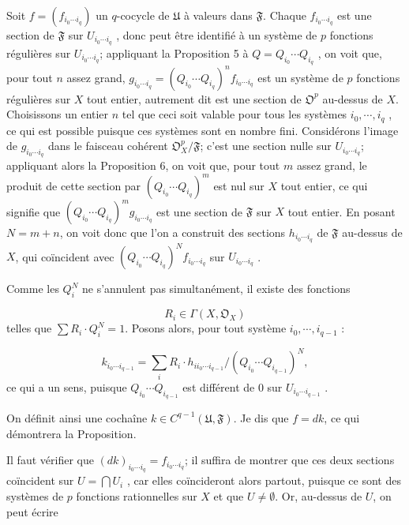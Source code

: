 Soit $f = (f_{i_0 \cdots i_q})$ un $q$-cocycle de $\mathfrak{U}$ à valeurs dans $\mathfrak{F}$. Chaque $f_{i_0 \cdots i_q}$ est une section de $\mathfrak{F}$ sur $U_{i_0 \cdots i_q}$ , donc peut être identifié à un système de $p$ fonctions régulières sur $U_{i_0 \cdots i_q}$; appliquant la Proposition 5 à $Q = Q_{i_0} \cdots Q_{i_q}$ , on voit que, pour tout $n$ assez grand, $g_{i_0 \cdots i_q} = (Q_{i_0} \cdots Q_{i_q})^n f_{i_0 \cdots i_q}$ est un système de $p$ fonctions régulières sur $X$ tout entier, autrement dit est une section de $\mathfrak{O}^p$ au-dessus de $X$. Choisissons un entier $n$ tel que ceci soit valable pour tous les systèmes $i_0 , \cdots , i_q$ , ce qui est possible puisque ces systèmes sont en nombre fini. Considérons l'image de $g_{i_0 \cdots i_q}$ dans le faisceau cohérent $\mathfrak{O}^p_X/\mathfrak{F}$; c'est une section nulle sur $U_{i_0 \cdots i_q}$; appliquant alors la Proposition 6, on voit que, pour tout $m$ assez grand, le produit de cette section par $(Q_{i_0} \cdots Q_{i_q})^m$ est nul sur $X$ tout entier, ce qui signifie que $(Q_{i_0} \cdots Q_{i_q})^m g_{i_0 \cdots i_q}$ est une section de $\mathfrak{F}$ sur $X$ tout entier. En posant $N = m + n$, on voit donc que l'on a construit des sections $h_{i_0 \cdots i_q}$ de $\mathfrak{F}$ au-dessus de $X$, qui coïncident avec $(Q_{i_0} \cdots Q_{i_q})^N f_{i_0 \cdots i_q}$ sur $U_{i_0 \cdots i_q}$ .

Comme les $Q_i^N$ ne s'annulent pas simultanément, il existe des fonctions

\begin{equation*}
R_i \in \Gamma(X, \mathfrak{O}_X)
\end{equation*}
telles que $\sum R_i \cdot Q_i^N = 1$. Posons alors, pour tout système $i_0 , \cdots , i_{q-1}$ :

\begin{equation*}
k_{i_0 \cdots i_{q-1}} = \sum_i R_i \cdot h_{i i_0 \cdots i_{q-1}}/(Q_{i_0} \cdots Q_{i_{q-1}})^N,
\end{equation*}
ce qui a un sens, puisque $Q_{i_0} \cdots Q_{i_{q-1}}$ est différent de 0 sur $U_{i_0 \cdots i_{q-1}}$ .

On définit ainsi une cochaîne $k \in C^{q-1}(\mathfrak{U}, \mathfrak{F})$. Je dis que $f = dk$, ce qui démontrera la Proposition.

Il faut vérifier que $(dk)_{i_0 \cdots i_q} = f_{i_0 \cdots i_q}$; il suffira de montrer que ces deux sections coïncident sur $U = \bigcap U_i$ , car elles coïncideront alors partout, puisque ce sont des systèmes de $p$ fonctions rationnelles sur $X$ et que $U \neq \emptyset$. Or, au-dessus de $U$, on peut écrire

